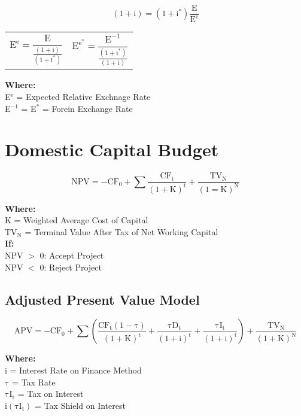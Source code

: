 \documentclass[11pt, english]{article}
\begin{document}
	$$\mathrm{(1+i)=(1+i^*)\frac{E}{E^e}}$$

	\begin{center}
	\begin{tabular}{p{5cm}p{5cm}}
		$$\mathrm{E^e=\frac{E}{\frac{(1+i)}{(1+i^*)}}}$$
		&
		$$\mathrm{E^{e^*}=\frac{E^{-1}}{\frac{(1+i^*)}{(1+i)}}}$$
	\end{tabular}
	\end{center}

	\textbf{Where:}\\
	E$\mathrm{^e}$ = Expected Relative Exchnage Rate\\
	E$\mathrm{^{-1}}$ = E$\mathrm{^*}$ = Forein Exchange Rate

\newpage

\section{Domestic Capital Budget}

	$$\mathrm{NPV=-CF_0+\sum\frac{CF_t}{(1+K)^t}+\frac{TV_N}{(1=K)^N}}$$

	\textbf{Where:}\\
	K = Weighted Average Cost of Capital\\
	TV$\mathrm{_N}$ = Terminal Value After Tax of Net Working Capital\\

	\textbf{If:}\\
	NPV $>$ 0: Accept Project\\
	NPV $<$ 0: Reject Project

	\subsection{Adjusted Present Value Model}

	$$\mathrm{APV=-CF_0+\sum\left(\frac{CF_t(1-\tau)}{(1+K)^t}+\frac{\tau D_t}{(1+i)^t}+\frac{\tau I_t}{(1+i)^t}\right)+\frac{TV_N}{(1+K)^N}}$$

	\textbf{Where:}\\
	i = Interest Rate on Finance Method\\
	$\mathrm{\tau}$ = Tax Rate\\
	$\mathrm{\tau I_t}$ = Tax on Interest\\
	$\mathrm{i(\tau I_t)}$ = Tax Shield on Interest
\end{document}
